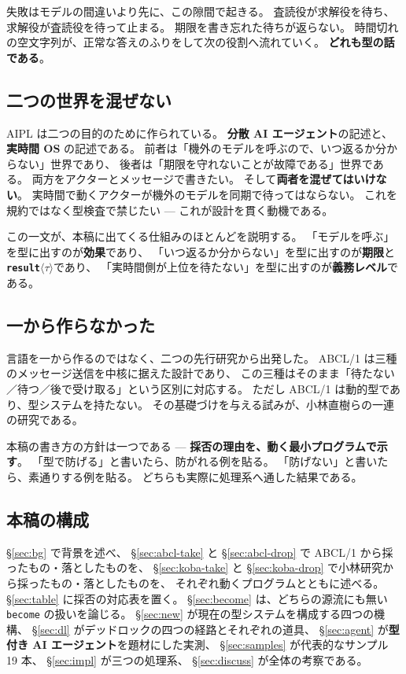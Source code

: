 \documentclass[11pt,a4paper]{ltjsarticle}
\theoremstyle{definition}
\theoremstyle{remark}
\begin{document}
失敗はモデルの間違いより先に、この隙間で起きる。
査読役が求解役を待ち、求解役が査読役を待って止まる。
期限を書き忘れた待ちが返らない。
時間切れの空文字列が、正常な答えのふりをして次の役割へ流れていく。
\textbf{どれも型の話である}。

\subsection{二つの世界を混ぜない}

AIPL は二つの目的のために作られている。
\textbf{分散 AI エージェント}の記述と、\textbf{実時間 OS} の記述である。
前者は「機外のモデルを呼ぶので、いつ返るか分からない」世界であり、
後者は「期限を守れないことが故障である」世界である。
両方をアクターとメッセージで書きたい。
そして\textbf{両者を混ぜてはいけない}。
実時間で動くアクターが機外のモデルを同期で待ってはならない。
これを規約ではなく型検査で禁じたい --- これが設計を貫く動機である。

この一文が、本稿に出てくる仕組みのほとんどを説明する。
「モデルを呼ぶ」を型に出すのが\textbf{効果}であり、
「いつ返るか分からない」を型に出すのが\textbf{期限}と
\textbf{\texttt{result}$\langle\tau\rangle$}であり、
「実時間側が上位を待たない」を型に出すのが\textbf{義務レベル}である。

\subsection{一から作らなかった}

言語を一から作るのではなく、二つの先行研究から出発した。
ABCL/1 は三種のメッセージ送信を中核に据えた設計であり、
この三種はそのまま「待たない／待つ／後で受け取る」という区別に対応する。
ただし ABCL/1 は動的型であり、型システムを持たない。
その基礎づけを与える試みが、小林直樹らの一連の研究である。

本稿の書き方の方針は一つである ---
\textbf{採否の理由を、動く最小プログラムで示す}。
「型で防げる」と書いたら、防がれる例を貼る。
「防げない」と書いたら、素通りする例を貼る。
どちらも実際に処理系へ通した結果である。

\subsection{本稿の構成}

\S\ref{sec:bg} で背景を述べ、
\S\ref{sec:abcl-take} と \S\ref{sec:abcl-drop} で ABCL/1 から採ったもの・落としたものを、
\S\ref{sec:koba-take} と \S\ref{sec:koba-drop} で小林研究から採ったもの・落としたものを、
それぞれ動くプログラムとともに述べる。
\S\ref{sec:table} に採否の対応表を置く。
\S\ref{sec:become} は、どちらの源流にも無い \texttt{become} の扱いを論じる。
\S\ref{sec:new} が現在の型システムを構成する四つの機構、
\S\ref{sec:dl} がデッドロックの四つの経路とそれぞれの道具、
\S\ref{sec:agent} が\textbf{型付き AI エージェント}を題材にした実測、
\S\ref{sec:samples} が代表的なサンプル 19 本、
\S\ref{sec:impl} が三つの処理系、
\S\ref{sec:discuss} が全体の考察である。
\end{document}
